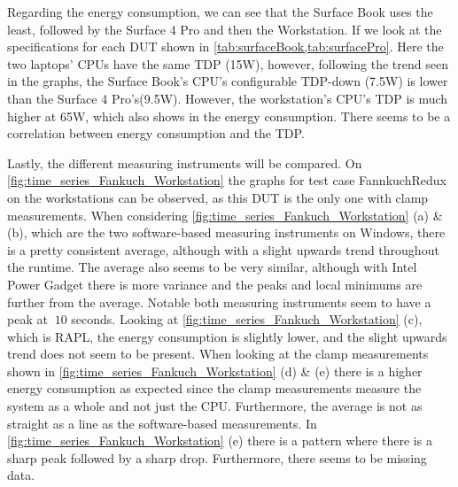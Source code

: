 

Regarding the energy consumption, we can see that the Surface Book uses the least, followed by the Surface 4 Pro and then the Workstation. If we look at the specifications for each DUT shown in \cref{tab:surfaceBook,tab:surfacePro}. Here the two laptops' CPUs have the same TDP (15W), however, following the trend seen in the graphs, the Surface Book's CPU's configurable TDP-down (7.5W) is lower than the Surface 4 Pro's(9.5W). However, the workstation's CPU's TDP is much higher at 65W, which also shows in the energy consumption. There seems to be a correlation between energy consumption and the TDP.


Lastly, the different measuring instruments will be compared. On \cref{fig:time_series_Fankuch_Workstation} the graphs for test case FannkuchRedux on the workstations can be observed, as this DUT is the only one with clamp measurements. When considering \cref{fig:time_series_Fankuch_Workstation} (a) \& (b), which are the two software-based measuring instruments on Windows, there is a pretty consistent average, although with a slight upwards trend throughout the runtime. The average also seems to be very similar, although with Intel Power Gadget there is more variance and the peaks and local minimums are further from the average. Notable both measuring instruments seem to have a peak at $~10$ seconds. Looking at \cref{fig:time_series_Fankuch_Workstation} (c), which is RAPL, the energy consumption is slightly lower, and the slight upwards trend does not seem to be present. When looking at the clamp measurements shown in \cref{fig:time_series_Fankuch_Workstation} (d) \& (e) there is a higher energy consumption as expected since the clamp measurements measure the system as a whole and not just the CPU. Furthermore, the average is not as straight as a line as the software-based measurements. In \cref{fig:time_series_Fankuch_Workstation} (e) there is a pattern where there is a sharp peak followed by a sharp drop. Furthermore, there seems to be missing data.










